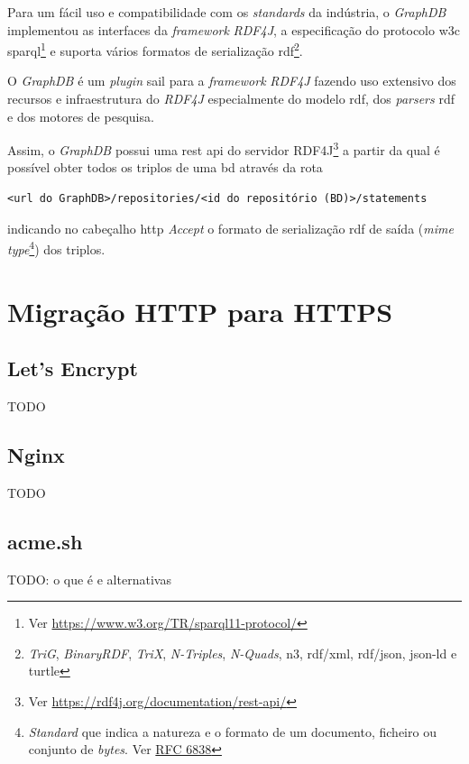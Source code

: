 Para um fácil uso e compatibilidade com os \textit{standards} da indústria, o \textit{GraphDB} implementou as interfaces da \textit{framework} \textit{RDF4J}, a especificação do protocolo \acrshort{w3c} \acrshort{sparql}\footnote{Ver \url{https://www.w3.org/TR/sparql11-protocol/}} e suporta vários formatos de serialização \acrshort{rdf}\footnote{\label{fnRDF}\textit{TriG}, \textit{BinaryRDF}, \textit{TriX}, \textit{N-Triples}, \textit{N-Quads}, \acrshort{n3}, \acrshort{rdf}/\acrshort{xml}, \acrshort{rdf}/\acrshort{json}, \acrshort{json-ld} e \acrshort{turtle}}.~\cite{graphdbAbout}

O \textit{GraphDB} é um \textit{plugin} \acrshort{sail} para a \textit{framework} \textit{RDF4J} fazendo uso extensivo dos recursos e infraestrutura do \textit{RDF4J} especialmente do modelo \acrshort{rdf}, dos \textit{parsers} \acrshort{rdf} e dos motores de pesquisa.~\cite{graphdbArch}

Assim, o \textit{GraphDB} possui uma \acrshort{rest} \acrshort{api} do servidor RDF4J\footnote{Ver \url{https://rdf4j.org/documentation/rest-api/}} a partir da qual é possível obter todos os triplos de uma \acrshort{bd} através da rota
\begin{verbatim}
<url do GraphDB>/repositories/<id do repositório (BD)>/statements
\end{verbatim}
indicando no cabeçalho \acrshort{http} \textit{Accept} o formato de serialização \acrshort{rdf} de saída (\textit{\acrshort{mime} type}\footnote{\textit{Standard} que indica a natureza e o formato de um documento, ficheiro ou conjunto de \textit{bytes}. Ver \href{https://tools.ietf.org/html/rfc6838}{RFC 6838}}) dos triplos.

\section{Migração HTTP para HTTPS}

\subsection{Let's Encrypt}
TODO

\subsection{Nginx}
TODO

\subsection{acme.sh}
TODO: o que é e alternativas

